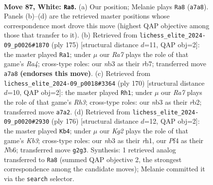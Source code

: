 \documentclass[11pt]{article}
\begin{document}
\clearpage

\begin{figure}[p]\centering
\begin{subfigure}{0.46\textwidth}\centering
\resizebox{\linewidth}{!}{%
\newchessgame
\chessboard[
  setfen={8/R6P/6p1/3k1p2/5P2/1n6/6K1/8 w - - 7 87},
  showmover=false,
  pgfstyle=straightmove, color=movearrow, markmove={a7-a8}
]}
\caption{}
\end{subfigure}\hfill
\begin{subfigure}{0.46\textwidth}\centering
\resizebox{\linewidth}{!}{%
\newchessgame
\chessboard[
  setfen={8/1R6/4k3/r5p1/6P1/5P2/6K1/8 b - - 83 88},
  showmover=false,
  pgfstyle=straightmove, color=movearrow, markmove={a5-a1}
]}
\caption{}
\end{subfigure}
\\[4pt]
\begin{subfigure}{0.46\textwidth}\centering
\resizebox{\linewidth}{!}{%
\newchessgame
\chessboard[
  setfen={8/7k/6p1/7p/7P/7R/1r6/5K2 w - - 32 86},
  showmover=false,
  pgfstyle=straightmove, color=movearrow, markmove={h3-h1}
]}
\caption{}
\end{subfigure}\hfill
\begin{subfigure}{0.46\textwidth}\centering
\resizebox{\linewidth}{!}{%
\newchessgame
\chessboard[
  setfen={8/1p6/pN1k4/P5R1/8/1K6/8/7r w - - 17 89},
  showmover=false,
  pgfstyle=straightmove, color=movearrow, markmove={b3-b4}
]}
\caption{}
\end{subfigure}
\caption{\textbf{Move 87, White: \texttt{Ra8}.} (a) Our position; Melanie plays \texttt{Ra8} (\texttt{a7a8}). Panels (b)--(d) are the retrieved master positions whose correspondence most drove this move (highest QAP objective among those that transfer to it). (b) Retrieved from \texttt{lichess\_elite\_2024-09\_p0026\#1870} (ply 175) [structural distance $d$=11, QAP obj=2]: the master played \texttt{Ra1}; under $\mu$ our \emph{Ra7} plays the role of that game's \emph{Ra4}; cross-type roles: our \emph{n}b3 as their \emph{r}b7; transferred move \texttt{a7a8} \textbf{(endorses this move)}. (c) Retrieved from \texttt{lichess\_elite\_2024-09\_p0018\#3364} (ply 170) [structural distance $d$=10, QAP obj=2]: the master played \texttt{Rh1}; under $\mu$ our \emph{Ra7} plays the role of that game's \emph{Rh3}; cross-type roles: our \emph{n}b3 as their \emph{r}b2; transferred move \texttt{a7a2}. (d) Retrieved from \texttt{lichess\_elite\_2024-09\_p0020\#2930} (ply 176) [structural distance $d$=12, QAP obj=2]: the master played \texttt{Kb4}; under $\mu$ our \emph{Kg2} plays the role of that game's \emph{Kb3}; cross-type roles: our \emph{n}b3 as their \emph{r}h1, our \emph{P}f4 as their \emph{N}b6; transferred move \texttt{g2g3}. Synthesis: 1 retrieved analog transferred to \texttt{Ra8} (summed QAP objective 2, the strongest correspondence among the candidate moves); Melanie committed it via the \texttt{search} selector.}
\label{fig:thought-m172}
\end{figure}
\end{document}
